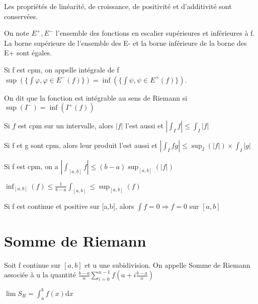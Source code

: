 \documentclass[french]{yLectureNote}
\newcommand{\dd}[0]{\mathrm{d}}
\begin{document}
%
\begin{proposition}
Les propriétés  de linéarité, de croissance, de positivité et d'additivité sont conservées.
\end{proposition}
\begin{proposition}
On note $E^+, E^-$ l'ensemble des fonctions en escalier supérieures et inférieures à f. La borne supérieure de l'ensemble des E- et la borne inférieure de la borne des E+ sont égales.
\end{proposition}
\begin{definition}
Si f est cpm, on appelle intégrale de f \(\sup(\{\int \varphi, \varphi \in E^-(f)\}) = \inf(\{\int \psi, \psi \in E^+(f)\})\).
\end{definition}
\begin{proposition}
On dit que la fonction est intégrable au sens de Riemann si \(\sup(I^-) = \inf(I^+(f))\)
\end{proposition}
\begin{proposition}[VA de l'intégrale]
Si \(f\) est cpm sur un intervalle, alors \(|f|\) l'est aussi et \(|\int_{I} f| \leq \int_I |f|\)
\end{proposition}
\begin{proposition}
Si f et g sont cpm, alors leur produit l'est aussi et \(|\int_I fg| \leq \sup_I(|f|) \times \int_I |g|\)
\end{proposition}
\begin{proposition}
Si f est cpm, on a \(|\int_{[a,b]} f| \leq (b-a)\sup_{[a,b]}(|f|)\)
\end{proposition}
\begin{proposition}
\(\inf_{[a,b]}(f) \leq \frac{1}{b-a}\int_{[a,b]}\leq \sup_{[a,b]}(f)\)
\end{proposition}
\begin{theorem}
 Si f est continue et positive sur [a,b], alors \(\int f = 0 \Rightarrow f = 0\) sur \([a,b]\)
\end{theorem}
\section{Somme de Riemann}
\begin{definition}
Soit f continue sur \([a,b]\) et u une subidivision. On appelle Somme de Riemann associée à u la quantité \(\frac{b-a}{n}\sum^{n-1}_{i=0} f(a+i\frac{b-a}{n})\)
\end{definition}
\begin{theorem}
 \(\lim S_R = \int^b_a f(x)\dd x\)
\end{theorem}
\end{document}
